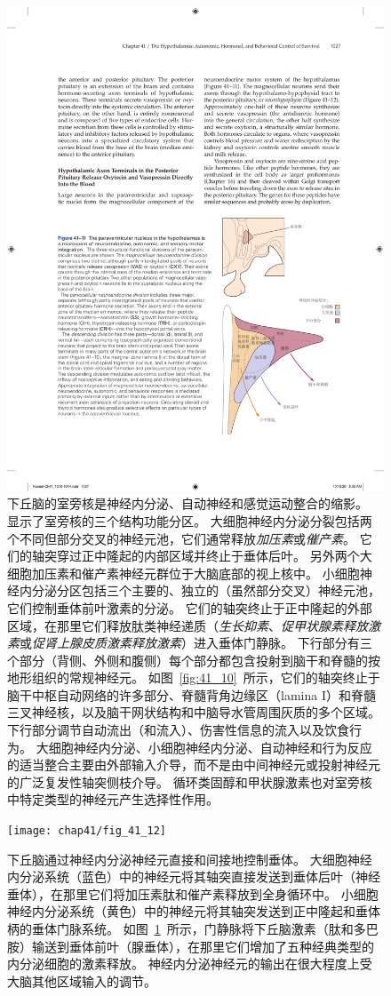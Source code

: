 \begin{figure}[htbp]
	\centering
	\includegraphics[width=0.54\linewidth]{chap41/fig_41_11}
	\caption{下丘脑的室旁核是神经内分泌、自动神经和感觉运动整合的缩影。
		显示了室旁核的三个结构功能分区。
		大细胞神经内分泌分裂包括两个不同但部分交叉的神经元池，它们通常释放\textit{加压素}或\textit{催产素}。
		它们的轴突穿过正中隆起的内部区域并终止于垂体后叶。
		另外两个大细胞加压素和催产素神经元群位于大脑底部的视上核中。
		小细胞神经内分泌分区包括三个主要的、独立的（虽然部分交叉）神经元池，它们控制垂体前叶激素的分泌。
		它们的轴突终止于正中隆起的外部区域，在那里它们释放肽类神经递质（\textit{生长抑素}、\textit{促甲状腺素释放激素}或\textit{促肾上腺皮质激素释放激素}）进入垂体门静脉。
		下行部分有三个部分（背侧、外侧和腹侧）每个部分都包含投射到脑干和脊髓的按地形组织的常规神经元。
		如图~\ref{fig:41_10}~所示，它们的轴突终止于脑干中枢自动网络的许多部分、脊髓背角边缘区（lamina I）和脊髓三叉神经核，以及脑干网状结构和中脑导水管周围灰质的多个区域。
		下行部分调节自动流出（和流入）、伤害性信息的流入以及饮食行为。
		大细胞神经内分泌、小细胞神经内分泌、自动神经和行为反应的适当整合主要由外部输入介导，而不是由中间神经元或投射神经元的广泛复发性轴突侧枝介导。
		循环类固醇和甲状腺激素也对室旁核中特定类型的神经元产生选择性作用。}
	\label{fig:41_11}
\end{figure}


\begin{figure}[htbp]
	\centering
	\texttt{[image: chap41/fig\_41\_12]}
	\caption{下丘脑通过神经内分泌神经元直接和间接地控制垂体。
		大细胞神经内分泌系统（蓝色）中的神经元将其轴突直接发送到垂体后叶（神经垂体），在那里它们将加压素肽和催产素释放到全身循环中。
		小细胞神经内分泌系统（黄色）中的神经元将其轴突发送到正中隆起和垂体柄的垂体门脉系统。
		如图~\ref{fig:41_11}~所示，门静脉将下丘脑激素（肽和多巴胺）输送到垂体前叶（腺垂体），在那里它们增加了五种经典类型的内分泌细胞的激素释放。
		神经内分泌神经元的输出在很大程度上受大脑其他区域输入的调节。}
	\label{fig:41_12}
\end{figure}


